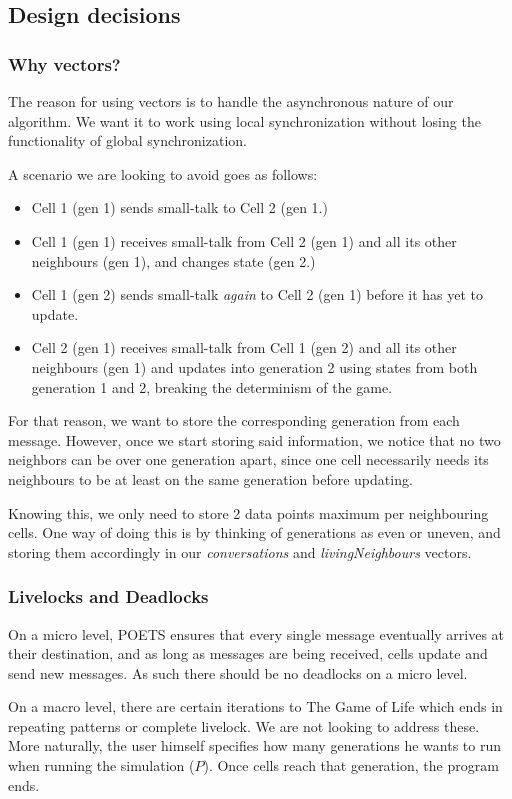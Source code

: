 \documentclass[a4paper]{article}
\begin{document}
\subsection*{Design decisions}
\subsubsection*{Why vectors?}
The reason for using vectors is to handle the asynchronous nature of our algorithm. We want it to work using local synchronization without losing the functionality of global synchronization. 
\par A scenario we are looking to avoid goes as follows:
\begin{itemize}
    \item Cell 1 (gen 1) sends small-talk to Cell 2 (gen 1.)
    \item Cell 1 (gen 1) receives small-talk from Cell 2 (gen 1) and all its other neighbours (gen 1), and changes state (gen 2.)
    \item Cell 1 (gen 2) sends small-talk \emph{again} to Cell 2 (gen 1) before it has yet to update.
    \item Cell 2 (gen 1) receives small-talk from Cell 1 (gen 2) and all its other neighbours (gen 1) and updates into generation 2 using states from both generation 1 and 2, breaking the determinism of the game.
\end{itemize}

For that reason, we want to store the corresponding generation from each message. However, once we start storing said information, we notice that no two neighbors can be over one generation apart, since one cell necessarily needs its neighbours to be at least on the same generation before updating. 
\par Knowing this, we only need to store 2 data points maximum per neighbouring cells. One way of doing this is by thinking of generations as even or uneven, and storing them accordingly in our \emph{conversations} and \emph{livingNeighbours} vectors.

\subsubsection*{Livelocks and Deadlocks}
On a micro level, POETS ensures that every single message eventually arrives at their destination, and as long as messages are being received, cells update and send new messages. As such there should be no deadlocks on a micro level. 
\par On a macro level, there are certain iterations to The Game of Life which ends in repeating patterns or complete livelock. We are not looking to address these. More naturally, the user himself specifies how many generations he wants to run when running the simulation ($P$). Once cells reach that generation, the program ends.
\end{document}

